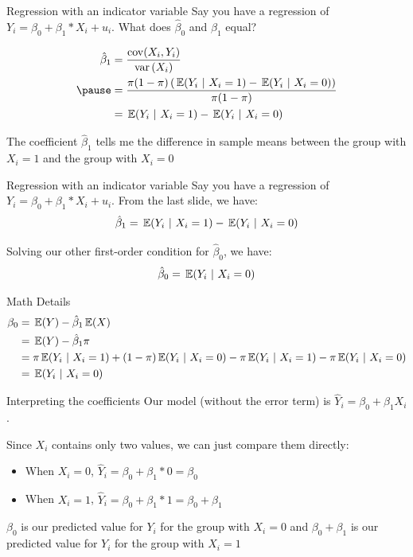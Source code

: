 \documentclass[aspectratio=169,t,11pt,table]{beamer}
\begin{document}
\begin{frame}{Regression with an indicator variable}
  Say you have a regression of $Y_i = \beta_0 + \beta_1 * X_i + u_i$. What does $\hat{\beta}_0$ and $\hat{\beta}_1$ equal?

  \begin{align*}
    \hat{\beta}_1 
    &= \frac{\cov(X_i, Y_i)}{\var{X_i}} \\ \pause
    &= \frac{\pi (1 - \pi) \left( \expec{Y_i}{X_i = 1} - \expec{Y_i}{X_i = 0} \right)}{\pi (1 - \pi)} \\
    &= \expec{Y_i}{X_i = 1} - \expec{Y_i}{X_i = 0}
  \end{align*}
  
  The coefficient $\hat{\beta}_1$ tells me the difference in sample means between the group with $X_i = 1$ and the group with $X_i = 0$
\end{frame}

\begin{frame}{Regression with an indicator variable}
  Say you have a regression of $Y_i = \beta_0 + \beta_1 * X_i + u_i$. From the last slide, we have:
  $$ 
    \hat{\beta}_1 = \expec{Y_i}{X_i = 1} - \expec{Y_i}{X_i = 0} 
  $$

  \bigskip
  Solving our other first-order condition for $\hat{\beta}_0$, we have:
  \begin{align*}
    \hat{\beta}_0 = \expec{Y_i}{X_i = 0}
  \end{align*}
\end{frame}

\begin{frame}{Math Details}
  \begin{align*}
    \beta_0 &= \expec{Y} - \hat{\beta}_1 \expec{X} \\
    &= \expec{Y} - \hat{\beta}_1 \pi \\
    &= \pi \expec{Y_i}{X_i = 1} + (1 - \pi) \expec{Y_i}{X_i = 0} - \pi \expec{Y_i}{X_i = 1} - \pi \expec{Y_i}{X_i = 0} \\
    &= \expec{Y_i}{X_i = 0}
  \end{align*}
\end{frame}

\begin{frame}{Interpreting the coefficients}
  Our model (without the error term) is $\hat{Y}_i = \beta_0 + \beta_1 X_i$.

  \bigskip
  Since $X_i$ contains only two values, we can just compare them directly:
  \begin{itemize}
    \item When $X_i = 0$, $\hat{Y}_i = \beta_0 + \beta_1 * 0 = \beta_0$
    
    \pause
    \item When $X_i = 1$, $\hat{Y}_i = \beta_0 + \beta_1 * 1 = \beta_0 + \beta_1$
  \end{itemize}

  \bigskip
  $\beta_0$ is our predicted value for $Y_i$ for the group with $X_i = 0$ and $\beta_0 + \beta_1$ is our predicted value for $Y_i$ for the group with $X_i = 1$ 
\end{frame}
\end{document}
